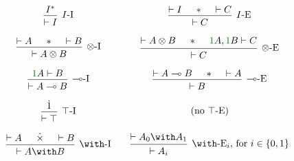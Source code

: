 \begin{figure}
  \begin{displaymath}
    \begin{matrix}
      \begin{prooftree}
        \hypo{I^*}
        \infer1[$I$-I]{\vdash I}
      \end{prooftree}
      &&
      \begin{prooftree}
        \hypo{\vdash I}
        \hypo{\sep}
        \hypo{\vdash C}
        \infer3[$I$-E]{\vdash C}
      \end{prooftree}
      \\\\
      \begin{prooftree}
        \hypo{\vdash A}
        \hypo{\sep}
        \hypo{\vdash B}
        \infer3[$\otimes$-I]{\vdash A \otimes B}
      \end{prooftree}
      &&
      \begin{prooftree}
        \hypo{\vdash A \otimes B}
        \hypo{\sep}
        \hypo{\gr1A, \gr1B \vdash C}
        \infer3[$\otimes$-E]{\vdash C}
      \end{prooftree}
      \\\\
      \begin{prooftree}
        \hypo{\gr1A \vdash B}
        \infer1[$\multimap$-I]{\vdash A \multimap B}
      \end{prooftree}
      &&
      \begin{prooftree}
        \hypo{\vdash A \multimap B}
        \hypo{\sep}
        \hypo{\vdash A}
        \infer3[$\multimap$-E]{\vdash B}
      \end{prooftree}
      \\\\
      \begin{prooftree}
        \hypo{\dot1}
        \infer1[$\top$-I]{\vdash \top}
      \end{prooftree}
      &&
      \textrm{(no $\top$-E)}
      \\\\
      \begin{prooftree}
        \hypo{\vdash A}
        \hypo{\dottimes}
        \hypo{\vdash B}
        \infer3[$\with$-I]{\vdash A \with B}
      \end{prooftree}
      &&
      \begin{prooftree}
        \hypo{\vdash A_0 \with A_1}
        \infer1[$\with$-E$_i$, for $i \in \{0,1\}$]{\vdash A_i}
      \end{prooftree}
      \\\\

\end{matrix}
\end{displaymath}
\end{figure}
